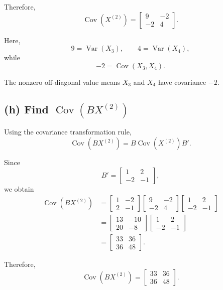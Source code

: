 \documentclass[12pt]{article}
\begin{document}
	Therefore,
	\[
	\boxed{
		\operatorname{Cov}(X^{(2)})
		=
		\begin{bmatrix}
			9&-2\\
			-2&4
		\end{bmatrix}
	}.
	\]
	
	Here,
	\[
	9=\operatorname{Var}(X_3),\qquad
	4=\operatorname{Var}(X_4),
	\]
	while
	\[
	-2=\operatorname{Cov}(X_3,X_4).
	\]
	
	The nonzero off-diagonal value means $X_3$ and $X_4$
	have covariance $-2$.
	
	\subsection*{(h) Find $\operatorname{Cov}(BX^{(2)})$}
	
	Using the covariance transformation rule,
	\[
	\operatorname{Cov}(BX^{(2)})
	=
	B\operatorname{Cov}(X^{(2)})B'.
	\]
	
	Since
	\[
	B'=
	\begin{bmatrix}
		1&2\\
		-2&-1
	\end{bmatrix},
	\]
	we obtain
	\[
	\begin{aligned}
		\operatorname{Cov}(BX^{(2)})
		&=
		\begin{bmatrix}
			1&-2\\
			2&-1
		\end{bmatrix}
		\begin{bmatrix}
			9&-2\\
			-2&4
		\end{bmatrix}
		\begin{bmatrix}
			1&2\\
			-2&-1
		\end{bmatrix}\\
		&=
		\begin{bmatrix}
			13&-10\\
			20&-8
		\end{bmatrix}
		\begin{bmatrix}
			1&2\\
			-2&-1
		\end{bmatrix}\\
		&=
		\begin{bmatrix}
			33&36\\
			36&48
		\end{bmatrix}.
	\end{aligned}
	\]
	
	Therefore,
	\[
	\boxed{
		\operatorname{Cov}(BX^{(2)})
		=
		\begin{bmatrix}
			33&36\\
			36&48
		\end{bmatrix}
	}.
	\]
	
\end{document}
